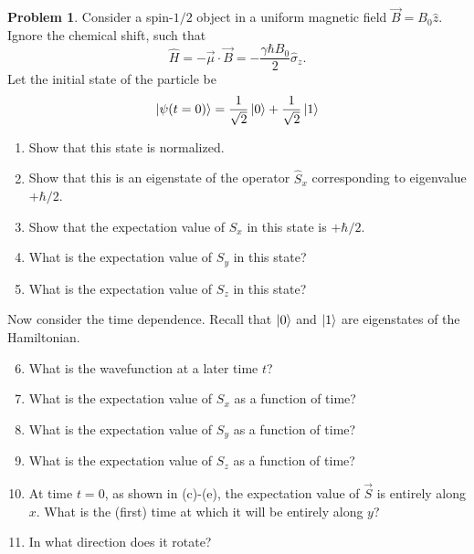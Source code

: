 \documentclass[10pt]{article}
\theoremstyle{definition}
\newtheorem{problem}{Problem}
\newcommand{\uz}{\hat{z}}
\newcommand{\bv}[1]{\vec{#1}}
\begin{document}
\begin{problem}
Consider a spin-$1/2$ object in a uniform magnetic field $\bv{B}=B_0\uz$. Ignore the chemical
shift, such that
$$\hat{H}=-\bv{\mu}\cdot\bv{B}=-\frac{\gamma \hbar B_0}{2}\hat{\sigma}_z.$$
Let the initial state of the particle be
$$\ket{\psi(t=0)}=\frac{1}{\sqrt{2}}\ket{0}+\frac{1}{\sqrt{2}}\ket{1}$$
\begin{enumerate}[label=(\alph*)]
  \item Show that this state is normalized.
  \item Show that this is an eigenstate of the operator $\hat{S}_x$ corresponding to eigenvalue $+\hbar/2$.
  \item Show that the expectation value of $S_x$ in this state is $+\hbar/2$.
  \item What is the expectation value of $S_y$ in this state?
  \item What is the expectation value of $S_z$ in this state?
\end{enumerate}

\noindent Now consider the time dependence. Recall that $\ket{0}$ and $\ket{1}$ are eigenstates of the Hamiltonian.
\begin{enumerate}[label=(\alph*)]
  \setcounter{enumi}{5}
  \item What is the wavefunction at a later time $t$?
  \item What is the expectation value of $S_x$ as a function of time?
  \item What is the expectation value of $S_y$ as a function of time?
  \item What is the expectation value of $S_z$ as a function of time?
  \item At time $t = 0$, as shown in (c)-(e), the expectation value of $\bv{S}$ is entirely along $x$. What
        is the (first) time at which it will be entirely along $y$?
  \item In what direction does it rotate?
\end{enumerate}

\end{problem}
\end{document}

